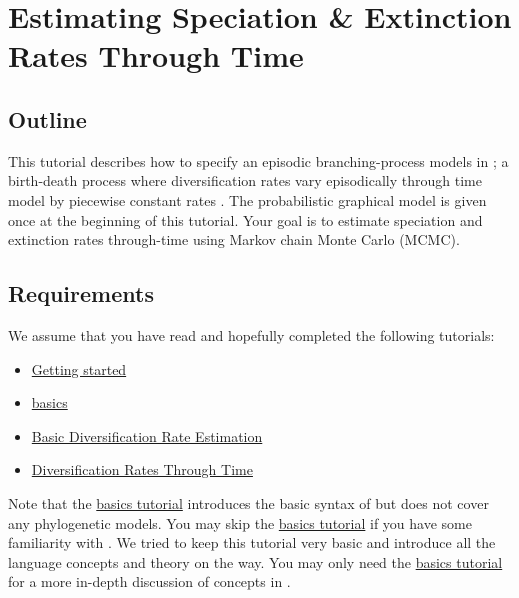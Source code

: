 \section{Estimating Speciation \& Extinction Rates Through Time}

\subsection{Outline}

This tutorial describes how to specify an episodic branching-process models in \RevBayes;
a birth-death process where diversification rates vary episodically through time model by piecewise constant rates \citep{Stadler2011,Hoehna2015a}.
The probabilistic graphical model is given once at the beginning of this tutorial.
Your goal is to estimate speciation and extinction rates through-time using Markov chain Monte Carlo (MCMC).


\subsection{Requirements}
We assume that you have read and hopefully completed the following tutorials:
\begin{itemize}
\item \href{https://github.com/revbayes/revbayes_tutorial/raw/master/tutorial_TeX/RB_Getting_Started/RB_Getting_Started.pdf}{Getting started}
\item \href{https://github.com/revbayes/revbayes_tutorial/raw/master/tutorial_TeX/RB_Basics_Tutorial/RB_Basics_Tutorial.pdf}{\Rev basics}
\item \href{https://github.com/revbayes/revbayes_tutorial/raw/master/tutorial_TeX/RB_DiversificationRate_Tutorial/RB_DiversificationRate_Tutorial.pdf}{Basic Diversification Rate Estimation}
\item \href{https://github.com/revbayes/revbayes_tutorial/raw/master/tutorial_TeX/RB_DiversificationRate_Episodic_Tutorial/RB_DiversificationRate_Episodic_Tutorial.pdf}{Diversification Rates Through Time}
\end{itemize}
Note that the \href{https://github.com/revbayes/revbayes_tutorial/raw/master/tutorial_TeX/RB_Basics_Tutorial/RB_Basics_Tutorial.pdf}{\Rev basics tutorial} introduces the basic syntax of \Rev but does not cover any phylogenetic models.
You may skip the \href{https://github.com/revbayes/revbayes_tutorial/raw/master/tutorial_TeX/RB_Basics_Tutorial/RB_Basics_Tutorial.pdf}{\Rev basics tutorial} if you have some familiarity with \R.
We tried to keep this tutorial very basic and introduce all the language concepts and theory on the way.
You may only need the \href{https://github.com/revbayes/revbayes_tutorial/raw/master/tutorial_TeX/RB_Basics_Tutorial/RB_Basics_Tutorial.pdf}{\Rev basics tutorial} for a more in-depth discussion of concepts in \Rev.

